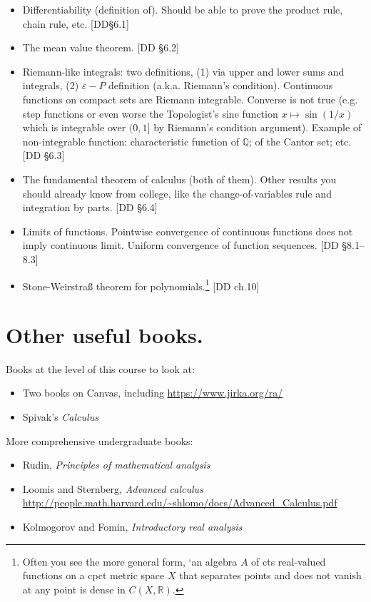 \documentclass[a4paper,twoside]{article}
\newcommand{\R}{\mathbb{R}}
\newcommand{\Q}{\mathbb{Q}}
\begin{document}
\begin{itemize}
          implies uniformly continuous. Example of uniformly cts but not Lipschitz: $ f : [0,1] \to [0,1] $ defined by $ f(x) = \sqrt{x} $. (Suppose it is $K$-Lipschitz,
          then $ \abs{\sqrt{0}-\sqrt{1/4K^2}} = 1/2K > 1/4K = K\abs{0 - 1/4K^2} $.) [DD \S5.1]
    \item Differentiability (definition of). Should be able to prove the product rule, chain rule, etc. [DD\S6.1]
    \item The mean value theorem. [DD \S6.2]
    \item Riemann-like integrals: two definitions, (1) via upper and lower sums and integrals, (2) $ \varepsilon-P $ definition (a.k.a. Riemann's condition). Continuous functions on compact sets are Riemann integrable. Converse is not true (e.g. step functions or even worse the Topologist's sine function $ x \mapsto \sin(1/x) $ which is integrable over $(0,1]$ by Riemann's condition argument). Example of non-integrable function: characteristic function of $ \Q $; of the Cantor set; etc. [DD \S6.3]
    \item The fundamental theorem of calculus (both of them). Other results you should already know from college, like the change-of-variables rule and integration by parts. [DD \S6.4]
    \item Limits of functions. Pointwise convergence of continuous functions does not imply continuous limit. Uniform convergence of function sequences. [DD \S8.1--8.3]
    \item Stone-Weirstra\ss{} theorem for polynomials.\footnote{Often you see the more general form, `an algebra $ A $ of cts real-valued functions on a cpct metric space $ X $ that separates points and does not vanish at any point is dense in $ C(X,\R) $.} [DD ch.10]
  \end{itemize}

  \section{Other useful books.}
  Books at the level of this course to look at:
  \begin{itemize}
    \item Two books on Canvas, including \url{https://www.jirka.org/ra/}
    \item Spivak's \textit{Calculus}
  \end{itemize}

  More comprehensive undergraduate books:
  \begin{itemize}
    \item Rudin, \textit{Principles of mathematical analysis}
    \item Loomis and Sternberg, \textit{Advanced calculus} \url{http://people.math.harvard.edu/~shlomo/docs/Advanced_Calculus.pdf}
    \item Kolmogorov and Fomin, \textit{Introductory real analysis}
  \end{itemize}
\end{document}
